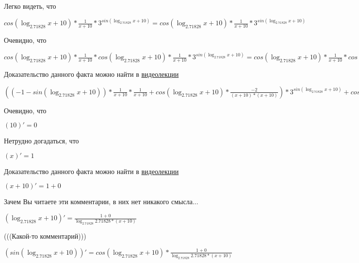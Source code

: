 \documentclass[12pt,a4paper,fleqn]{article}
\theoremstyle{definition}
\begin{document}
Легко видеть, что

$cos(\log_{ 2.71828 }{ x  +  10 }) * \frac{ 1 }{ x  +  10 }
 * { 3 }^{sin(\log_{ 2.71828 }{ x  +  10 })} = cos(\log_{ 2.71828 }{ x  +  10 }) * \frac{ 1 }{ x  +  10 }
 * { 3 }^{sin(\log_{ 2.71828 }{ x  +  10 })}$

Очевидно, что

$cos(\log_{ 2.71828 }{ x  +  10 }) * \frac{ 1 }{ x  +  10 }
 * cos(\log_{ 2.71828 }{ x  +  10 }) * \frac{ 1 }{ x  +  10 }
 * { 3 }^{sin(\log_{ 2.71828 }{ x  +  10 })} = cos(\log_{ 2.71828 }{ x  +  10 }) * \frac{ 1 }{ x  +  10 }
 * cos(\log_{ 2.71828 }{ x  +  10 }) * \frac{ 1 }{ x  +  10 }
 * { 3 }^{sin(\log_{ 2.71828 }{ x  +  10 })}$

Доказательство данного факта можно найти в \href{https://www.youtube.com/watch?v=dQw4w9WgXcQ}{видеолекции}

$(( -1  - sin(\log_{ 2.71828 }{ x  +  10 })) * \frac{ 1 }{ x  +  10 }
 * \frac{ 1 }{ x  +  10 }
 + cos(\log_{ 2.71828 }{ x  +  10 }) * \frac{ -2 }{( x  +  10 ) * ( x  +  10 )}
) * { 3 }^{sin(\log_{ 2.71828 }{ x  +  10 })} + cos(\log_{ 2.71828 }{ x  +  10 }) * \frac{ 1 }{ x  +  10 }
 * cos(\log_{ 2.71828 }{ x  +  10 }) * \frac{ 1 }{ x  +  10 }
 * { 3 }^{sin(\log_{ 2.71828 }{ x  +  10 })} = (( -1  - sin(\log_{ 2.71828 }{ x  +  10 })) * \frac{ 1 }{ x  +  10 }
 * \frac{ 1 }{ x  +  10 }
 + cos(\log_{ 2.71828 }{ x  +  10 }) * \frac{ -2 }{( x  +  10 ) * ( x  +  10 )}
) * { 3 }^{sin(\log_{ 2.71828 }{ x  +  10 })} + cos(\log_{ 2.71828 }{ x  +  10 }) * \frac{ 1 }{ x  +  10 }
 * cos(\log_{ 2.71828 }{ x  +  10 }) * \frac{ 1 }{ x  +  10 }
 * { 3 }^{sin(\log_{ 2.71828 }{ x  +  10 })}$

Очевидно, что

$( 10 )' =  0 $

Нетрудно догадаться, что

$( x )' =  1 $

Доказательство данного факта можно найти в \href{https://www.youtube.com/watch?v=dQw4w9WgXcQ}{видеолекции}

$( x  +  10 )' =  1  +  0 $

Зачем Вы читаете эти комментарии, в них нет никакого смысла...

$(\log_{ 2.71828 }{ x  +  10 })' = \frac{ 1  +  0 }{\log_{ 2.71828 }{ 2.71828 } * ( x  +  10 )}
$

(((Какой-то комментарий)))

$(sin(\log_{ 2.71828 }{ x  +  10 }))' = cos(\log_{ 2.71828 }{ x  +  10 }) * \frac{ 1  +  0 }{\log_{ 2.71828 }{ 2.71828 } * ( x  +  10 )}
$
\end{document}
